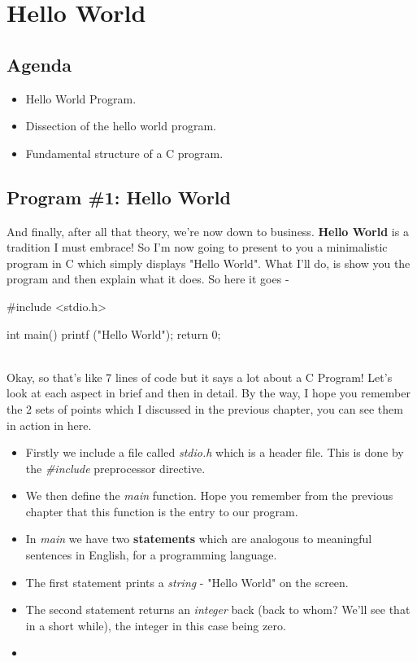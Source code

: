 \chapter{Hello World}


\section{Agenda}
\begin{itemize}
 \item Hello World Program.
 \item Dissection of the hello world program.
 \item Fundamental structure of a C program.
\end{itemize}

\section{Program \#1: Hello World}
And finally, after all that theory, we're now down to business. \textbf{Hello World} is a tradition I must embrace! So I'm now going to present to you a minimalistic program in C which simply displays "Hello World". What I'll do, is show you the program and then explain what it does. So here it goes - \\

\begin{ccode}
#include <stdio.h>

int main()
{
  printf ("Hello World\n");
  return 0;
}
\end{ccode}
\\

Okay, so that's like 7 lines of code but it says a lot about a C Program! Let's look at each aspect in brief and then in detail. By the way, I hope you remember the 2 sets of points which I discussed in the previous chapter, you can see them in action in here.

\begin{itemize}
\item Firstly we include a file called \textit{stdio.h} which is a header file. This is done by the \textit{\#include} preprocessor directive.
\item We then define the \textit{main} function. Hope you remember from the previous chapter that this function is the entry to our program. 
\item In \textit{main} we have two \textbf{statements} which are analogous to meaningful sentences in English, for a programming language. 
\item The first statement prints a \textit{string} - "Hello World\n" on the screen. 
\item The second statement returns an \textit{integer} back (back to whom? We'll see that in a short while), the integer in this case being zero. 
\end{itemize}

\begin{itemize}
\item 
\end{itemize}
